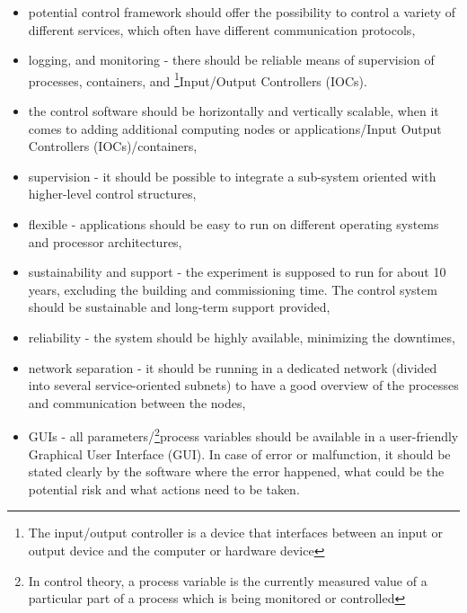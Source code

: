  
 \begin{itemize}
    \item potential control framework should offer the possibility to control a variety of different services, which often have different communication protocols,
    \item logging, and monitoring - there should be reliable means of supervision of processes, containers, and \footnote{The input/output controller is a device that interfaces between an input or output device and the computer or hardware device}{Input/Output Controllers} (\glspl{IOC}).
    \item the control software should be horizontally and vertically scalable, when it comes to adding additional computing nodes or applications/Input Output Controllers (\glspl{IOC})/containers,
    \item supervision - it should be possible to integrate a sub-system oriented with higher-level control structures,
     \item flexible - applications should be easy to run on different operating systems and processor architectures,
     \item sustainability and support - the experiment is supposed to run for about 10 years, excluding the building and commissioning time. The control system should be sustainable and long-term support provided,
     \item reliability - the system should be highly available, minimizing the downtimes,
     \item network separation - it should be running in a dedicated network (divided into several service-oriented subnets) to have a good overview of the processes and communication between the nodes,
     \item \glspl{GUI} - all parameters/\footnote{In control theory, a process variable is the currently measured value of a particular part of a process which is being monitored or controlled}{process variables} should be available in a user-friendly Graphical User Interface (\gls{GUI}). In case of error or malfunction, it should be stated clearly by the software where the error happened, what could be the potential risk and what actions need to be taken.

 \end{itemize}
\newpage

